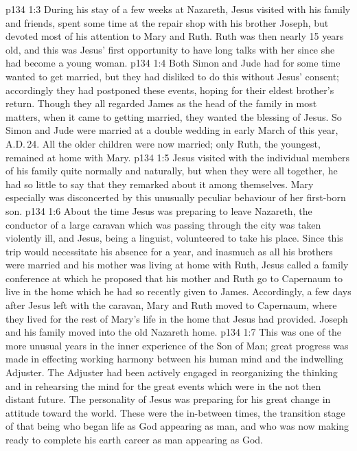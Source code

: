 \vs p134 1:3 During his stay of a few weeks at Nazareth, Jesus visited with his family and friends, spent some time at the repair shop with his brother Joseph, but devoted most of his attention to Mary and Ruth. Ruth was then nearly 15 years old, and this was Jesus’ first opportunity to have long talks with her since she had become a young woman.
\vs p134 1:4 Both Simon and Jude had for some time wanted to get married, but they had disliked to do this without Jesus’ consent; accordingly they had postponed these events, hoping for their eldest brother’s return. Though they all regarded James as the head of the family in most matters, when it came to getting married, they wanted the blessing of Jesus. So Simon and Jude were married at a double wedding in early March of this year, A.D.\,24. All the older children were now married; only Ruth, the youngest, remained at home with Mary.
\vs p134 1:5 Jesus visited with the individual members of his family quite normally and naturally, but when they were all together, he had so little to say that they remarked about it among themselves. Mary especially was disconcerted by this unusually peculiar behaviour of her first\hyp{}born son.
\vs p134 1:6 About the time Jesus was preparing to leave Nazareth, the conductor of a large caravan which was passing through the city was taken violently ill, and Jesus, being a linguist, volunteered to take his place. Since this trip would necessitate his absence for a year, and inasmuch as all his brothers were married and his mother was living at home with Ruth, Jesus called a family conference at which he proposed that his mother and Ruth go to Capernaum to live in the home which he had so recently given to James. Accordingly, a few days after Jesus left with the caravan, Mary and Ruth moved to Capernaum, where they lived for the rest of Mary’s life in the home that Jesus had provided. Joseph and his family moved into the old Nazareth home.
\vs p134 1:7 This was one of the more unusual years in the inner experience of the Son of Man; great progress was made in effecting working harmony between his human mind and the indwelling Adjuster. The Adjuster had been actively engaged in reorganizing the thinking and in rehearsing the mind for the great events which were in the not then distant future. The personality of Jesus was preparing for his great change in attitude toward the world. These were the in\hyp{}between times, the transition stage of that being who began life as God appearing as man, and who was now making ready to complete his earth career as man appearing as God.
